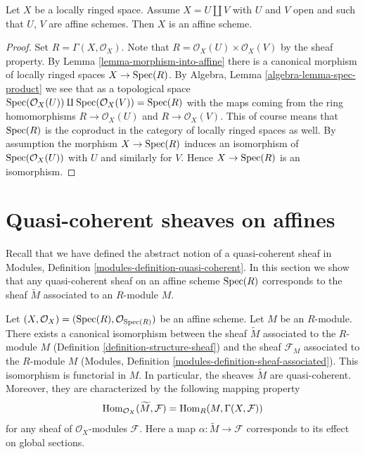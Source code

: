 \begin{lemma}
\label{lemma-disjoint-union-affines}
Let $X$ be a locally ringed space.
Assume $X = U \amalg V$ with $U$ and $V$ open and
such that $U$, $V$ are affine schemes. Then $X$ is an affine scheme.
\end{lemma}

\begin{proof}
Set $R = \Gamma(X, \mathcal{O}_X)$.
Note that $R = \mathcal{O}_X(U) \times \mathcal{O}_X(V)$
by the sheaf property. By Lemma \ref{lemma-morphism-into-affine}
there is a canonical morphism of locally ringed spaces
$X \to \mathop{\mathrm{Spec}}(R)$. By Algebra, Lemma \ref{algebra-lemma-spec-product}
we see that as a topological space
$\mathop{\mathrm{Spec}}(\mathcal{O}_X(U)) \amalg \mathop{\mathrm{Spec}}(\mathcal{O}_X(V)) =
\mathop{\mathrm{Spec}}(R)$
with the maps coming from the ring homomorphisms
$R \to \mathcal{O}_X(U)$ and $R \to \mathcal{O}_X(V)$.
This of course means that $\mathop{\mathrm{Spec}}(R)$ is the coproduct
in the category of locally ringed spaces as well.
By assumption the morphism $X \to \mathop{\mathrm{Spec}}(R)$ induces an isomorphism
of $\mathop{\mathrm{Spec}}(\mathcal{O}_X(U))$ with $U$ and similarly
for $V$. Hence $X \to \mathop{\mathrm{Spec}}(R)$ is an isomorphism.
\end{proof}















\section{Quasi-coherent sheaves on affines}
\label{section-quasi-coherent-affine}

\noindent
Recall that we have defined the abstract notion of a quasi-coherent
sheaf in Modules, Definition \ref{modules-definition-quasi-coherent}.
In this section we show that any quasi-coherent sheaf on an affine
scheme $\mathop{\mathrm{Spec}}(R)$ corresponds to the sheaf $\widetilde M$ associated to
an $R$-module $M$.

\begin{lemma}
\label{lemma-compare-constructions}
Let $(X, \mathcal{O}_X) = (\mathop{\mathrm{Spec}}(R), \mathcal{O}_{\mathop{\mathrm{Spec}}(R)})$
be an affine scheme. Let $M$ be an $R$-module. There exists a canonical
isomorphism between the sheaf $\widetilde M$ associated to the $R$-module
$M$ (Definition \ref{definition-structure-sheaf}) and the sheaf
$\mathcal{F}_M$ associated to the $R$-module $M$
(Modules, Definition \ref{modules-definition-sheaf-associated}).
This isomorphism is functorial in $M$. In particular,
the sheaves $\widetilde M$ are quasi-coherent. Moreover, they
are characterized by the following mapping property
$$
\mathop{\mathrm{Hom}}\nolimits_{\mathcal{O}_X}(\widetilde M, \mathcal{F})
=
\mathop{\mathrm{Hom}}\nolimits_R(M, \Gamma(X, \mathcal{F}))
$$
for any sheaf of $\mathcal{O}_X$-modules $\mathcal{F}$.
Here a map $\alpha : \widetilde M \to \mathcal{F}$ corresponds
to its effect on global sections.
\end{lemma}

